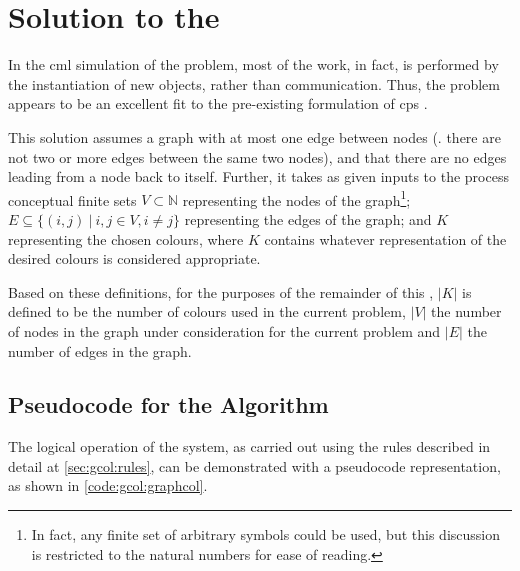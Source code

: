 \section{\label{sec:gcol:cpsys} Solution to the }
In the \gls{cml} simulation of the problem, most of the work, in fact, is performed by the instantiation of new objects, rather than communication.  Thus, the problem appears to be an excellent fit to the pre-existing formulation of \gls{cps} \cite{Nicolescu2018}.

This solution assumes a graph with at most one edge between nodes (\ie{}. there are not two or more edges between the same two nodes), and that there are no edges leading from a node back to itself.  Further, it takes as given inputs to the process conceptual finite sets \(V \subset \mathbb{N}\) representing the nodes of the graph\footnote{In fact, any finite set of arbitrary symbols could be used, but this discussion is restricted to the natural numbers for ease of reading.}; \(E \subseteq \{(i,j)~|~i, j \in V, i \neq j \}\) representing the edges of the graph; and \(K\) representing the chosen colours, where \(K\) contains whatever representation of the desired colours is considered appropriate.

Based on these definitions, for the purposes of the remainder of this , \(|K|\) is defined to be the number of colours used in the current problem, \(|V|\) the number of nodes in the graph under consideration for the current problem and \(|E|\) the number of edges in the graph.

\subsection{Pseudocode for the  Algorithm}
The logical operation of the system, as carried out using the rules described in detail at \cref{sec:gcol:rules}, can be demonstrated with a pseudocode representation, as shown in \cref{code:gcol:graphcol}.

